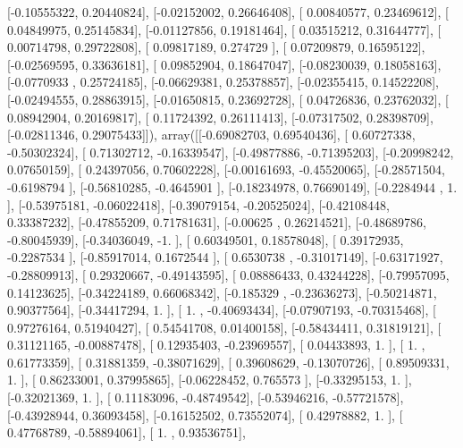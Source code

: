 \documentclass{article}
\begin{document}
       [-0.10555322,  0.20440824],
       [-0.02152002,  0.26646408],
       [ 0.00840577,  0.23469612],
       [ 0.04849975,  0.25145834],
       [-0.01127856,  0.19181464],
       [ 0.03515212,  0.31644777],
       [ 0.00714798,  0.29722808],
       [ 0.09817189,  0.274729  ],
       [ 0.07209879,  0.16595122],
       [-0.02569595,  0.33636181],
       [ 0.09852904,  0.18647047],
       [-0.08230039,  0.18058163],
       [-0.0770933 ,  0.25724185],
       [-0.06629381,  0.25378857],
       [-0.02355415,  0.14522208],
       [-0.02494555,  0.28863915],
       [-0.01650815,  0.23692728],
       [ 0.04726836,  0.23762032],
       [ 0.08942904,  0.20169817],
       [ 0.11724392,  0.26111413],
       [-0.07317502,  0.28398709],
       [-0.02811346,  0.29075433]]), array([[-0.69082703,  0.69540436],
       [ 0.60727338, -0.50302324],
       [ 0.71302712, -0.16339547],
       [-0.49877886, -0.71395203],
       [-0.20998242,  0.07650159],
       [ 0.24397056,  0.70602228],
       [-0.00161693, -0.45520065],
       [-0.28571504, -0.6198794 ],
       [-0.56810285, -0.4645901 ],
       [-0.18234978,  0.76690149],
       [-0.2284944 ,  1.        ],
       [-0.53975181, -0.06022418],
       [-0.39079154, -0.20525024],
       [-0.42108448,  0.33387232],
       [-0.47855209,  0.71781631],
       [-0.00625   ,  0.26214521],
       [-0.48689786, -0.80045939],
       [-0.34036049, -1.        ],
       [ 0.60349501,  0.18578048],
       [ 0.39172935, -0.2287534 ],
       [-0.85917014,  0.1672544 ],
       [ 0.6530738 , -0.31017149],
       [-0.63171927, -0.28809913],
       [ 0.29320667, -0.49143595],
       [ 0.08886433,  0.43244228],
       [-0.79957095,  0.14123625],
       [-0.34224189,  0.66068342],
       [-0.185329  , -0.23636273],
       [-0.50214871,  0.90377564],
       [-0.34417294,  1.        ],
       [ 1.        , -0.40693434],
       [-0.07907193, -0.70315468],
       [ 0.97276164,  0.51940427],
       [ 0.54541708,  0.01400158],
       [-0.58434411,  0.31819121],
       [ 0.31121165, -0.00887478],
       [ 0.12935403, -0.23969557],
       [ 0.04433893,  1.        ],
       [ 1.        ,  0.61773359],
       [ 0.31881359, -0.38071629],
       [ 0.39608629, -0.13070726],
       [ 0.89509331,  1.        ],
       [ 0.86233001,  0.37995865],
       [-0.06228452,  0.765573  ],
       [-0.33295153,  1.        ],
       [-0.32021369,  1.        ],
       [ 0.11183096, -0.48749542],
       [-0.53946216, -0.57721578],
       [-0.43928944,  0.36093458],
       [-0.16152502,  0.73552074],
       [ 0.42978882,  1.        ],
       [ 0.47768789, -0.58894061],
       [ 1.        ,  0.93536751],
\end{document}
